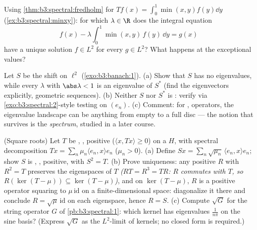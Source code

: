 \begin{exercise}[$\star\star$]\label{exo:b3:spectral:9}
Using \cref{thm:b3:spectral:fredholm} for $Tf(x) =
\int_0^1\min(x,y)f(y)\dd y$ (\cref{ex:b3:spectral:minxy}):
for which $\lambda \in \R$ does the integral equation
\[
f(x) - \lambda\int_0^1\min(x,y)\,f(y)\,\dd y = g(x)
\]
have a unique solution $f \in L^2$ for every $g \in L^2$? What
happens at the exceptional values?
\end{exercise}

\begin{exercise}[$\star\star\star$]\label{exo:b3:spectral:10}
Let $S$ be the shift on $\ell^2$
(\cref{exo:b3:banach:1}).
(a) Show that $S$ has no eigenvalues, while every $\lambda$
with $\abs\lambda < 1$ is an eigenvalue of $S^*$ (find the
eigenvectors explicitly, geometric sequences).
(b) Neither $S$ nor $S^*$ is : verify via
\cref{exo:b3:spectral:2}-style testing on $(e_n)$.
(c) Comment: for ,  operators, the
eigenvalue landscape can be anything from empty to a full
disc --- the notion that survives is the \emph{spectrum},
studied in a later course.
\end{exercise}

\begin{exercise}[$\star\star$]\label{exo:b3:spectral:11}
(Square roots) Let $T$ be , , positive
($\langle x, Tx\rangle \geq 0$) on a  $H$, with
spectral decomposition $Tx = \sum_n\mu_n\langle e_n,
x\rangle e_n$ ($\mu_n > 0$).
(a) Define $Sx = \sum_n\sqrt{\mu_n}\,\langle e_n, x\rangle
e_n$; show $S$ is , , positive, with $S^2
= T$.
(b) Prove uniqueness: any  positive  $R$
with $R^2 = T$ preserves the eigenspaces of $T$
\emph{($RT = R^3 = TR$: $R$ commutes with $T$, so
$R(\ker(T - \mu)) \subseteq \ker(T - \mu)$)}, and on
$\ker(T - \mu)$, $R$ is a positive operator squaring to
$\mu\,\mathrm{id}$ on a finite-dimensional space:
diagonalize it there and conclude $R =
\sqrt\mu\,\mathrm{id}$ on each eigenspace, hence $R = S$.
(c) Compute $\sqrt G$ for the string operator $G$ of
\cref{pb:b3:spectral:1}: which kernel has eigenvalues
$\frac1{n\pi}$ on the sine basis? (Express $\sqrt G$ as the
$L^2$-limit of kernels; no closed form is required.)
\end{exercise}

